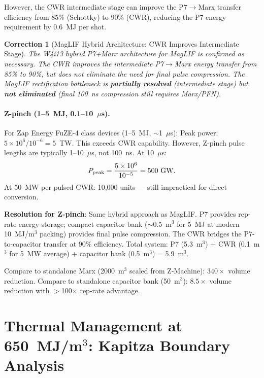 \documentclass[11pt]{article}
\newtheorem{correction}{Correction}
\newcommand{\ee}[1]{\times 10^{#1}}
\begin{document}
However, the CWR intermediate stage can improve the P7$\to$Marx
transfer efficiency from 85\% (Schottky) to 90\% (CWR), reducing
the P7 energy requirement by 0.6~MJ per shot.

\begin{correction}[MagLIF Hybrid Architecture: CWR Improves Intermediate Stage]
\label{corr:MagLIF-CWR}
The W4i13 hybrid P7+Marx architecture for MagLIF is confirmed as
necessary. The CWR improves the intermediate P7$\to$Marx energy
transfer from 85\% to 90\%, but does not eliminate the need for
final pulse compression. The MagLIF rectification bottleneck is
\textbf{partially resolved} (intermediate stage) but \textbf{not
eliminated} (final 100~ns compression still requires Marx/PFN).
\end{correction}

\paragraph{Z-pinch (1--5~MJ, 0.1--10~$\mu$s).}
For Zap Energy FuZE-4 class devices (1--5~MJ, $\sim$1~$\mu$s):
Peak power: $5\ee{6}/10^{-6} = 5$~TW. This exceeds CWR capability.
However, Z-pinch pulse lengths are typically 1--10~$\mu$s, not 100~ns.
At 10~$\mu$s:
\begin{equation}
P_{\rm peak} = \frac{5\ee{6}}{10^{-5}} = 500~\text{GW}.
\end{equation}
At 50~MW per pulsed CWR: 10,000 units --- still impractical for
direct conversion.

\textbf{Resolution for Z-pinch}: Same hybrid approach as MagLIF.
P7 provides rep-rate energy storage; compact capacitor bank
($\sim$0.5~m$^3$ for 5~MJ at modern 10~MJ/m$^3$ packing) provides
final pulse compression. The CWR bridges the P7-to-capacitor
transfer at 90\% efficiency. Total system: P7 (5.3~m$^3$) + CWR
(0.1~m$^3$ for 5~MW average) + capacitor bank (0.5~m$^3$) = 5.9~m$^3$.

Compare to standalone Marx (2000~m$^3$ scaled from Z-Machine):
$340\times$ volume reduction. Compare to standalone capacitor bank
(50~m$^3$): $8.5\times$ volume reduction with $>$100$\times$ rep-rate
advantage.

\section{Thermal Management at 650~MJ/m$^3$: Kapitza Boundary Analysis}
\label{sec:thermal}
\end{document}
